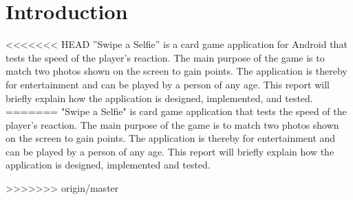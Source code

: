 \section{Introduction}
<<<<<<< HEAD
''Swipe a Selfie'' is a card game application for Android that tests the speed of the player's reaction. The main purpose of the game is to match two photos shown on the screen to gain points. The application is thereby for entertainment and can be played by a person of any age. This report will briefly explain how the application is designed, implemented, and tested.
=======
"Swipe a Selfie" is card game application that tests the speed of the player’s reaction. The main purpose of the game is to match two photos shown on the screen to gain points. The application is thereby for entertainment and can be played by a person of any age. This report will briefly explain how the application is designed, implemented and tested.

>>>>>>> origin/master
